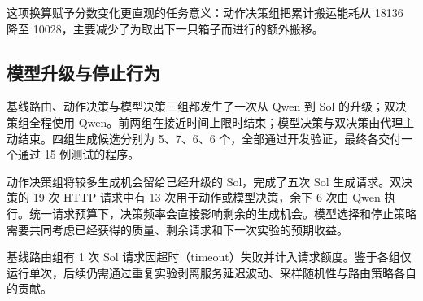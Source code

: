 这项换算赋予分数变化更直观的任务意义：动作决策组把累计搬运能耗从 18136 降至 10028，主要减少了为取出下一只箱子而进行的额外搬移。

\subsection{模型升级与停止行为}
基线路由、动作决策与模型决策三组都发生了一次从 Qwen 到 Sol 的升级；双决策组全程使用 Qwen。前两组在接近时间上限时结束；模型决策与双决策由代理主动结束。四组生成候选分别为 5、7、6、6 个，全部通过开发验证，最终各交付一个通过 15 例测试的程序。

动作决策组将较多生成机会留给已经升级的 Sol，完成了五次 Sol 生成请求。双决策的 19 次 HTTP 请求中有 13 次用于动作或模型决策，余下 6 次由 Qwen 执行。统一请求预算下，决策频率会直接影响剩余的生成机会。模型选择和停止策略需要共同考虑已经获得的质量、剩余请求和下一次实验的预期收益。

基线路由组有 1 次 Sol 请求因超时（timeout）失败并计入请求额度。鉴于各组仅运行单次，后续仍需通过重复实验剥离服务延迟波动、采样随机性与路由策略各自的贡献。
